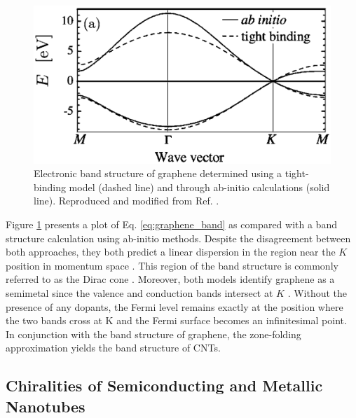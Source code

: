 \begin{figure}[h]
	\centering
	\includegraphics[scale=0.5]{images/chapter_optical_props/graphene_band_charlier}
	\caption{Electronic band structure of graphene determined using a tight-binding model (dashed line) and through ab-initio calculations (solid line). Reproduced and modified from Ref. \cite{reich2002tight}.}
	\label{fig:graphene_band}
\end{figure}
%
Figure \ref{fig:graphene_band} presents a plot of Eq. \ref{eq:graphene_band} as compared with a band structure calculation using ab-initio methods. Despite the disagreement between both approaches, they both predict a linear dispersion in the region near the $K$ position in momentum space \cite{charlier2007electronic}. This region of the band structure is commonly referred to as the Dirac cone	\cite{charlier2007electronic}. Moreover, both models identify graphene as a semimetal since the valence and conduction bands intersect at $K$ \cite{charlier2007electronic}. Without the presence of any dopants, the Fermi level remains exactly at the position where the two bands cross at K and the Fermi surface becomes an infinitesimal point. In conjunction with the band structure of graphene, the zone-folding approximation yields the band structure of CNTs.

\subsection{Chiralities of Semiconducting and Metallic Nanotubes}

